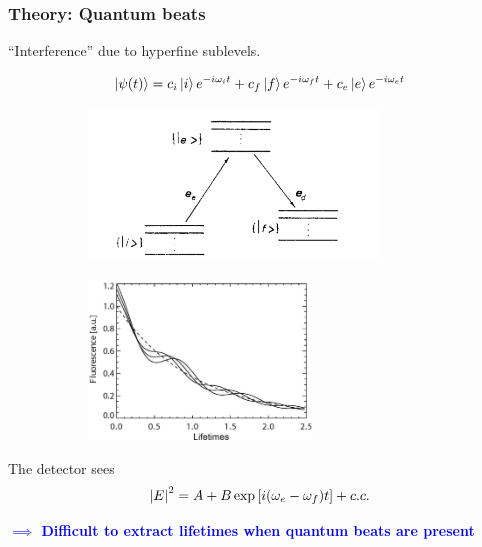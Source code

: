 \documentclass{beamer}
\theoremstyle{definition}
\begin{document}
\begin{frame}
\frametitle{Theory: Quantum beats}

``Interference'' due to hyperfine sublevels. 


\begin{equation*}
\ket{\psi(t)} = c_i \ket{i}e^{-i\omega_i t} + c_f \ket{f}e^{-i\omega_f t} + c_e \ket{e}e^{-i\omega_e t}
\end{equation*}



\begin{figure}[!htb]
	\centering
	\hspace{10 pt}
	\begin{subfigure}{0.49\textwidth}
		\includegraphics[width=0.85\textwidth]{energies}
	\end{subfigure}
	\hspace{-20 pt}
	\begin{subfigure}{0.49\textwidth}
		\includegraphics[width=0.65\textwidth]{qbeats1}
	\end{subfigure}
\end{figure}


The detector sees
\begin{equation*}
\abs{E}^2 = A +  B\exp\left[i(\omega_{e} - \omega_{f})t \right] + c.c.
\end{equation*}

\textbf{\textcolor{blue}{$\implies$ Difficult to extract lifetimes when quantum beats are present}}

\end{frame}
\end{document}

